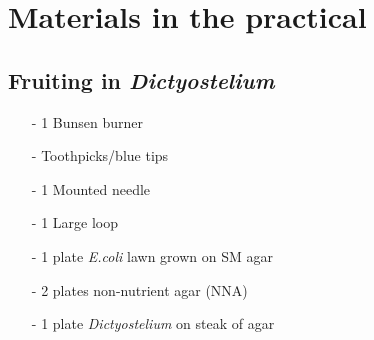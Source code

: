 \section{Materials in the practical}

\subsection{Fruiting in \textsl{Dictyostelium}}
\begin{itemize}
    \item [-] 1 Bunsen burner 
    \item [-] Toothpicks/blue tips 
    \item [-] 1 Mounted needle 
    \item [-] 1 Large loop 
    \item [-] 1 plate \textsl{E.coli} lawn grown on SM agar 
    \item [-] 2 plates non-nutrient agar (NNA) 
    \item [-] 1 plate \textsl{Dictyostelium} on steak of agar
\end{itemize}
\label{appendix:a}

\label{appendix:c}